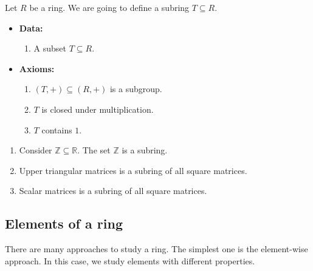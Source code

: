 \begin{definition}
Let $R$ be a ring.
We are going to define a subring $T\subseteq R$.
\begin{itemize}
\item\textbf{Data:} 
\begin{enumerate}
\item A subset $T\subseteq R$.
\end{enumerate}

\item\textbf{Axioms:}
\begin{enumerate}
\item $(T, +)\subseteq (R, +)$ is a subgroup.

\item $T$ is closed under multiplication.

\item $T$ contains $1$.
\end{enumerate}
\end{itemize}
\end{definition}

\begin{examples}
\begin{enumerate}
\item Consider $\mathbb Z\subseteq \mathbb R$.
The set $\mathbb Z$ is a subring.

\item Upper triangular matrices is a subring of all square matrices.

\item Scalar matrices is a subring of all square matrices.
\end{enumerate}
\end{examples}

\subsection{Elements of a ring}

There are many approaches to study a ring.
The simplest one is the element-wise approach.
In this case, we study elements with different properties.

